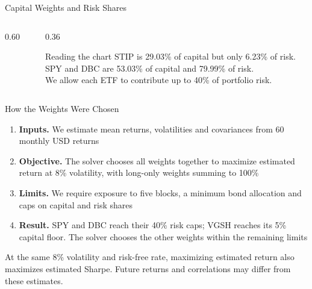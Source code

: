 \documentclass[aspectratio=169,11pt,t]{beamer}
\newenvironment{callout}[1]{\begin{calloutbox}{#1}}{\end{calloutbox}}
\begin{document}
\begin{frame}{Capital Weights and Risk Shares}
\vspace{0.5em}
\begin{columns}[T]
\begin{column}{0.60\textwidth}
\end{column}
\begin{column}{0.36\textwidth}
\vspace{0.4em}
\begin{callout}{Reading the chart}
STIP is 29.03\% of capital but only 6.23\% of risk.\\[4pt]
SPY and DBC are 53.03\% of capital and 79.99\% of risk.\\[4pt]
\footnotesize\color{muted}We allow each ETF to contribute up to 40\% of portfolio risk.
\end{callout}
\end{column}
\end{columns}
\end{frame}

\begin{frame}{How the Weights Were Chosen}
\vspace{0.6em}
\begin{enumerate}\setlength{\itemsep}{0.65em}\small
\item \textbf{Inputs.} We estimate mean returns, volatilities and covariances from 60 monthly USD returns
\item \textbf{Objective.} The solver chooses all weights together to maximize estimated return at 8\% volatility, with long-only weights summing to 100\%
\item \textbf{Limits.} We require exposure to five blocks, a minimum bond allocation and caps on capital and risk shares
\item \textbf{Result.} SPY and DBC reach their 40\% risk caps; VGSH reaches its 5\% capital floor. The solver chooses the other weights within the remaining limits
\end{enumerate}
\vfill
{\footnotesize\color{muted}At the same 8\% volatility and risk-free rate, maximizing estimated return also maximizes estimated Sharpe. Future returns and correlations may differ from these estimates.\par}
\end{frame}
\end{document}
